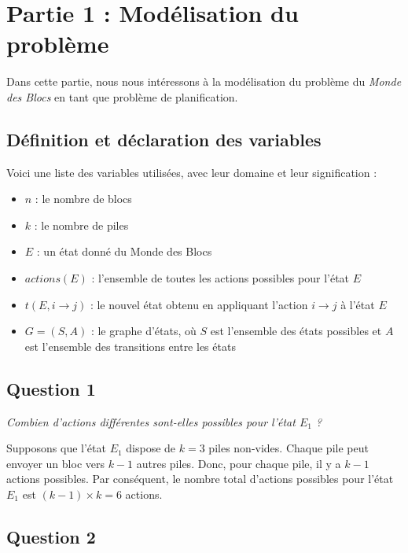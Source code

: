 
\section{Partie 1 : Modélisation du problème}

Dans cette partie, nous nous intéressons à la modélisation du problème du \textit{Monde des Blocs} en tant que problème de planification.

\subsection{Définition et déclaration des variables}
Voici une liste des variables utilisées, avec leur domaine et leur signification :

\begin{itemize}
    \item $n$ : le nombre de blocs
    \item $k$ : le nombre de piles
    \item $E$ : un état donné du Monde des Blocs
    \item $actions(E)$ : l'ensemble de toutes les actions possibles pour l'état $E$
    \item $t(E, i \rightarrow j)$ : le nouvel état obtenu en appliquant l'action $i \rightarrow j$ à l'état $E$
    \item $G = (S, A)$ : le graphe d'états, où $S$ est l'ensemble des états possibles et $A$ est l'ensemble des transitions entre les états
\end{itemize}

\subsection{Question 1}

\textit{Combien d'actions différentes sont-elles possibles pour l'état $E_1$ ?}

Supposons que l'état $E_1$ dispose de $k = 3$ piles non-vides. Chaque pile peut envoyer un bloc vers $k - 1$ autres piles. Donc, pour chaque pile, il y a $k - 1$ actions possibles. Par conséquent, le nombre total d'actions possibles pour l'état $E_1$ est $(k - 1) \times k = 6$ actions.

\subsection{Question 2}

